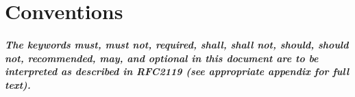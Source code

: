 \chapter*{Conventions}

\paragraph{
The keywords \emph{must}, \emph{must not}, \emph{required}, \emph{shall},
\emph{shall not}, \emph{should}, \emph{should not}, \emph{recommended},
\emph{may}, and \emph{optional} in this document are to be interpreted as
described in RFC2119 (see appropriate appendix for full text).
}
